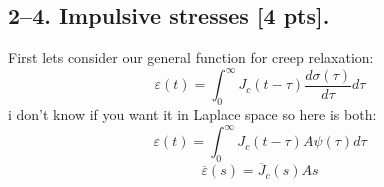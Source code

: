 \subsection*{2--4. \textbf{Impulsive stresses} [4 pts].}
First lets consider our general function for creep relaxation:
\begin{equation}
    \varepsilon(t) = \int_0^{\infty}J_c(t-\tau)\frac{d\sigma(\tau)}{d\tau}d\tau
\end{equation}
i don't know if you want it in Laplace space so here is both:
\begin{equation}
    \boxed{\varepsilon(t) = \int_0^{\infty}J_c(t-\tau)A\psi(\tau) d\tau}
\end{equation}
\begin{equation}
    \boxed{\overline{\varepsilon}(s) = \overline{J}_c(s)As}
\end{equation}

